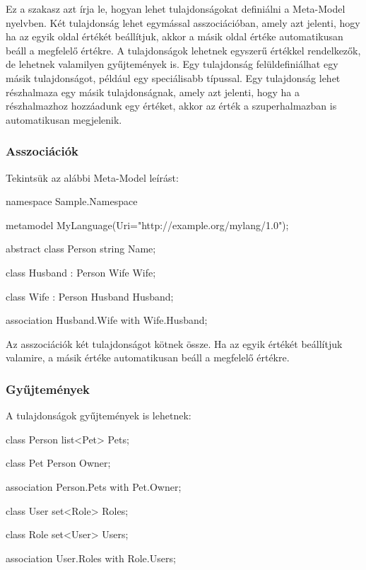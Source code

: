 \documentclass[12pt, a4paper]{report}
\begin{document}
Ez a szakasz azt írja le, hogyan lehet tulajdonságokat definiálni a Meta-Model nyelvben. Két tulajdonság lehet egymással asszociációban, amely azt jelenti, hogy ha az egyik oldal értékét beállítjuk, akkor a másik oldal értéke automatikusan beáll a megfelelő értékre. A tulajdonságok lehetnek egyszerű értékkel rendelkezők, de lehetnek valamilyen gyűjtemények is. Egy tulajdonság felüldefiniálhat egy másik tulajdonságot, például egy speciálisabb típussal. Egy tulajdonság lehet részhalmaza egy másik tulajdonságnak, amely azt jelenti, hogy ha a részhalmazhoz hozzáadunk egy értéket, akkor az érték a szuperhalmazban is automatikusan megjelenik.

\subsubsection{Asszociációk}

Tekintsük az alábbi Meta-Model leírást:

\begin{mmcode}
namespace Sample.Namespace
{
	metamodel MyLanguage(Uri="http://example.org/mylang/1.0"); 
	
	abstract class Person
	{
		string Name;
	}
	
	class Husband : Person
	{
		Wife Wife;
	}
	
	class Wife : Person
	{
		Husband Husband;
	}
	
	association Husband.Wife with Wife.Husband;
}
\end{mmcode}

Az asszociációk két tulajdonságot kötnek össze. Ha az egyik értékét beállítjuk valamire, a másik értéke automatikusan beáll a megfelelő értékre.

\subsubsection{Gyűjtemények}

A tulajdonságok gyűjtemények is lehetnek:

\begin{mmcode}
class Person
{
	list<Pet> Pets;
}

class Pet
{
	Person Owner;
}

association Person.Pets with Pet.Owner;

class User
{
	set<Role> Roles;
}

class Role
{
	set<User> Users;
}

association User.Roles with Role.Users;
\end{mmcode}
\end{document}
